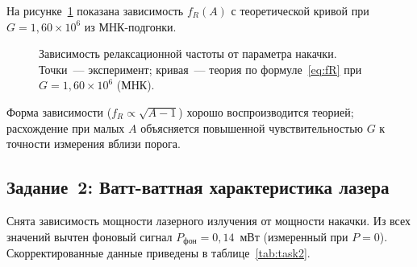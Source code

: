 \documentclass[12pt,a4paper]{article}
\begin{document}
На рисунке~\ref{fig:frel} показана зависимость $f_R(A)$ с теоретической
кривой при $G = 1{,}60\times10^6$ из МНК-подгонки.

\begin{figure}[H]
  \centering
  \caption{Зависимость релаксационной частоты от параметра накачки.
  Точки~--- эксперимент; кривая~--- теория по формуле~\eqref{eq:fR}
  при $G = 1{,}60\times10^6$ (МНК).}
  \label{fig:frel}
\end{figure}

Форма зависимости ($f_R \propto \sqrt{A-1}$) хорошо воспроизводится
теорией; расхождение при малых $A$ объясняется повышенной чувствительностью
$G$ к точности измерения вблизи порога.

\subsection{Задание~2: Ватт-ваттная характеристика лазера}

Снята зависимость мощности лазерного излучения от мощности накачки.
Из всех значений вычтен фоновый сигнал $P_\text{фон} = 0{,}14$~мВт
(измеренный при $P = 0$). Скорректированные данные приведены в
таблице~\ref{tab:task2}.
\end{document}
